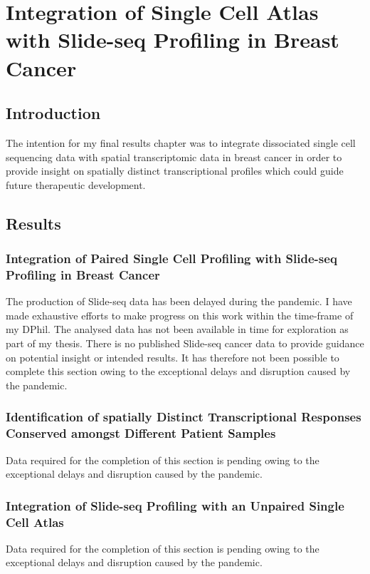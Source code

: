 \chapter{\label{ch:5}Integration of Single Cell Atlas with Slide-seq Profiling in Breast Cancer}

\section{Introduction}
The intention for my final results chapter was to integrate dissociated single cell sequencing data with spatial transcriptomic data in breast cancer in order to provide insight on spatially distinct transcriptional profiles which could guide future therapeutic development.


\section{Results}

\subsection{Integration of Paired Single Cell Profiling with Slide-seq Profiling in Breast Cancer}
The production of Slide-seq data has been delayed during the pandemic. I have made exhaustive efforts to make progress on this work within the time-frame of my DPhil. The analysed data has not been available in time for exploration as part of my thesis. There is no published Slide-seq cancer data to provide guidance on potential insight or intended results. It has therefore not been possible to complete this section owing to the exceptional delays and disruption caused by the pandemic. 

\subsection{Identification of spatially Distinct Transcriptional Responses Conserved amongst Different Patient Samples}
Data required for the completion of this section is pending owing to the exceptional delays and disruption caused by the pandemic. 

\subsection{Integration of Slide-seq Profiling with an Unpaired Single Cell Atlas}
Data required for the completion of this section is pending owing to the exceptional delays and disruption caused by the pandemic. 

